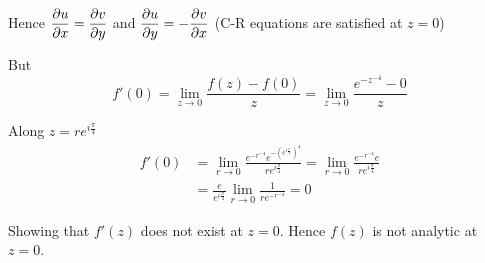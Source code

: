 \begin{solution}
Hence $\displaystyle \frac{\partial u}{\partial x}=\frac{\partial v}{\partial y}$
and $\displaystyle \frac{\partial u}{\partial y}=-\frac{\partial v}{\partial x}$
(C-R equations are satisfied at $z=0$)

But \[
f'(0)=\lim_{z\rightarrow0}\frac{f(z)-f(0)}{z}=\lim_{z \rightarrow 0}\frac{e^{-z^{-4}}-0}{z}\]


Along $z=re^{i\frac{\pi}{4}}$ \begin{align*}
f'(0) & =\lim_{r\rightarrow0}\frac{e^{-r^{-4}}e^{-\left(e^{i\frac{\pi}{4}}\right)^{4}}}{re^{i\frac{\pi}{4}}}=\lim_{r\rightarrow0}\frac{e^{-r^{-4}}e}{re^{i\frac{\pi}{4}}}\\
 & =\frac{e}{e^{i\frac{\pi}{4}}}\lim_{r\rightarrow0}\frac{1}{re^{-r^{-4}}}=0\end{align*}


Showing that $f'(z)$ does not exist at $z=0$. Hence $f(z)$ is not
analytic at $z=0$.
\end{solution}


